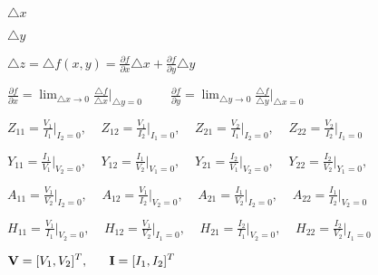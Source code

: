\documentclass{article}
\def\lthtmlcheckvsize{\ifdim\ht\sizebox<\vsize 
  \ifdim\wd\sizebox<\hsize\expandafter\hfill\fi \expandafter\vfill
  \else\expandafter\vss\fi}%
\begin{document}
{\newpage\clearpage
{}%
$ \triangle x$%
\lthtmlindisplaymathZ
\lthtmlcheckvsize\clearpage}

{\newpage\clearpage
{}%
$ \triangle y$%
\lthtmlindisplaymathZ
\lthtmlcheckvsize\clearpage}

{\newpage\clearpage
{}%
$\displaystyle \triangle z=\triangle f(x,y)=\frac{\partial f}{\partial x}\triangle x +
\frac{\partial f}{\partial y}\triangle y$%
\lthtmlindisplaymathZ
\lthtmlcheckvsize\clearpage}

{\newpage\clearpage
{}%
$\displaystyle \frac{\partial f}{\partial x}=\lim_{\triangle x\rightarrow 0}
\frac{\triangle f}{\triangle x}\bigg|_{\triangle y=0}
\;\;\;\;\;\;\;\;
\frac{\partial f}{\partial y}=\lim_{\triangle y\rightarrow 0}
\frac{\triangle f}{\triangle y}\bigg|_{\triangle x=0}$%
\lthtmlindisplaymathZ
\lthtmlcheckvsize\clearpage}

{\newpage\clearpage
{}%
$\displaystyle Z_{11}=\frac{V_1}{I_1}\bigg|_{I_2=0},\;\;\;\;
Z_{12}=\frac{V_1}{I_2}\bigg|_{I_1=0},\;\;\;\;
Z_{21}=\frac{V_2}{I_1}\bigg|_{I_2=0},\;\;\;\;
Z_{22}=\frac{V_2}{I_2}\bigg|_{I_1=0}$%
\lthtmlindisplaymathZ
\lthtmlcheckvsize\clearpage}

{\newpage\clearpage
{}%
$\displaystyle Y_{11}=\frac{I_1}{V_1}\bigg|_{V_2=0},\;\;\;\;
Y_{12}=\frac{I_1}{V_2}\bigg|_{V_1=0},\;\;\;\;
Y_{21}=\frac{I_2}{V_1}\bigg|_{V_2=0},\;\;\;\;
Y_{22}=\frac{I_2}{V_2}\bigg|_{Y_1=0},\;\;\;\;$%
\lthtmlindisplaymathZ
\lthtmlcheckvsize\clearpage}

{\newpage\clearpage
{}%
$\displaystyle A_{11}=\frac{V_1}{V_2}\bigg|_{I_2=0},\;\;\;\;
A_{12}=\frac{V_1}{I_2}\bigg|_{V_2=0},\;\;\;\;
A_{21}=\frac{I_1}{V_2}\bigg|_{I_2=0},\;\;\;\;
A_{22}=\frac{I_1}{I_2}\bigg|_{V_2=0}$%
\lthtmlindisplaymathZ
\lthtmlcheckvsize\clearpage}

{\newpage\clearpage
{}%
$\displaystyle H_{11}=\frac{V_1}{I_1}\bigg|_{V_2=0},\;\;\;\;
H_{12}=\frac{V_1}{V_2}\bigg|_{I_1=0},\;\;\;\;
H_{21}=\frac{I_2}{I_1}\bigg|_{V_2=0},\;\;\;\;
H_{22}=\frac{I_2}{V_2}\bigg|_{I_1=0}$%
\lthtmlindisplaymathZ
\lthtmlcheckvsize\clearpage}

{\newpage\clearpage
{}%
$\displaystyle {\bf V}=[V_1, V_2]^T,\;\;\;\;\;\;{\bf I}=[I_1, I_2]^T$%
\lthtmlindisplaymathZ
\lthtmlcheckvsize\clearpage}
\end{document}
